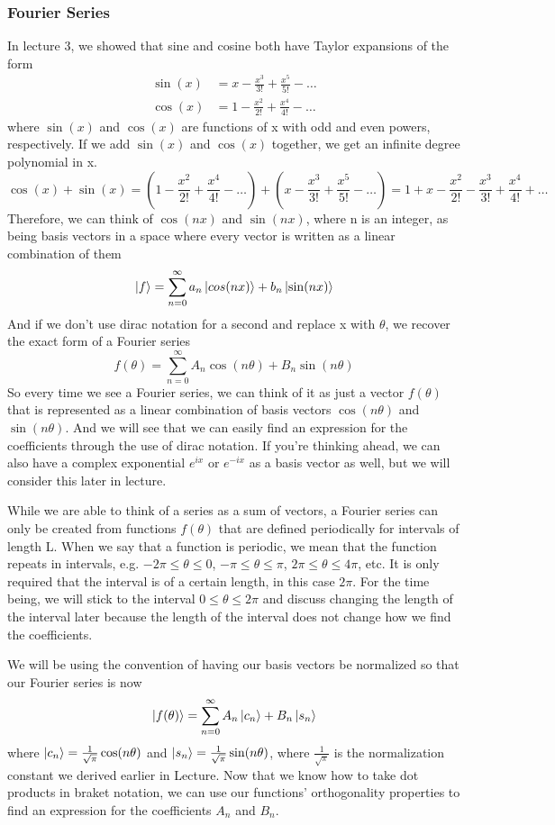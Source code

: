 \documentclass{article}
\newcommand{\be}{\begin{equation}}
\newcommand{\ee}{\end{equation}}
\begin{document}
\subsubsection*{Fourier Series}
In lecture 3, we showed that sine and cosine both have Taylor expansions of the form
\be
  \begin{split}
    \sin(x) &= x - \frac{x^3}{3!} + \frac{x^5}{5!} - \hdots \\
    \cos(x) &= 1 - \frac{x^2}{2!} + \frac{x^4}{4!} - \hdots
  \end{split}
\ee
where $\sin(x)$ and $\cos(x)$ are functions of x with odd and even powers, respectively.
If we add $\sin(x)$ and $\cos(x)$ together, we get an infinite degree polynomial in x.
\be
  \cos(x) + \sin(x) = (1 - \frac{x^2}{2!} + \frac{x^4}{4!} - \hdots) + (x - \frac{x^3}{3!} + \frac{x^5}{5!} - \hdots) = 1 + x - \frac{x^2}{2!} - \frac{x^3}{3!} + \frac{x^4}{4!} + \hdots
\ee
Therefore, we can think of $\cos(nx)$ and $\sin(nx)$, where n is an integer, as being basis vectors in a space where every vector is written as a linear combination of them
\be
  \ket{f} = \sum_{n = 0}^{\infty} a_n \ket{cos(nx)} + b_n \ket{\sin(nx)}
\ee
And if we don't use dirac notation for a second and replace x with $\theta$, we recover the exact form of a Fourier series
\be
  f(\theta) = \sum_{n = 0}^{\infty} A_n \cos(n \theta) + B_n \sin(n \theta)
\ee
So every time we see a Fourier series, we can think of it as just a vector $f(\theta)$ that is represented as a linear combination of basis vectors $\cos(n \theta)$ and $\sin(n \theta)$.
And we will see that we can easily find an expression for the coefficients through the use of dirac notation.
If you're thinking ahead, we can also have a complex exponential $e^{ix}$ or $e^{-ix}$ as a basis vector as well, but we will consider this later in lecture.

While we are able to think of a series as a sum of vectors, a Fourier series can only be created from functions $f(\theta)$ that are defined periodically for intervals of length L.
When we say that a function is periodic, we mean that the function repeats in intervals, e.g. $- 2\pi \leq \theta \leq 0$, $- \pi \leq \theta \leq \pi$, $2 \pi \leq \theta \leq 4 \pi $, etc.
It is only required that the interval is of a certain length, in this case $2 \pi$.
For the time being, we will stick to the interval $0 \leq \theta \leq 2 \pi$ and discuss changing the length of the interval later because the length of the interval does not change how we find the coefficients.

We will be using the convention of having our basis vectors be normalized so that our Fourier series is now
\be
  \ket{f(\theta)} = \sum_{n=0}^{\infty} A_n \ket{c_n} + B_n \ket{s_n}
\ee
where $\ket{c_n} = \frac{1}{\sqrt{\pi}} \cos(n \theta)$ and $\ket{s_n} = \frac{1}{\sqrt{\pi}} \sin(n \theta)$, where $\frac{1}{\sqrt{\pi}}$ is the normalization constant we derived earlier in Lecture.
Now that we know how to take dot products in braket notation, we can use our functions' orthogonality properties to find an expression for the coefficients $A_n$ and $B_n$.
\end{document}
